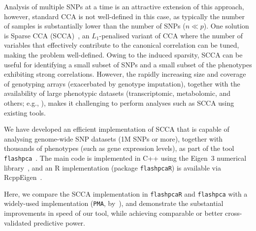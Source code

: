 \documentclass{bioinfo}
\begin{document}
Analysis of multiple SNPs at a time is an attractive extension of
this approach, however, standard CCA is not well-defined in this
case, as typically the number of samples is substantially lower
than the number of SNPs ($n{\ll}p$).  One solution is Sparse CCA
(SCCA)~\citep{Witten2009b,Witten2009c,Parkhomenko2009}, an $L_1$-penalised
variant of CCA where the number of variables that effectively contribute to
the canonical correlation can be tuned, making the problem well-defined. Owing
to the induced sparsity, SCCA can be useful for identifying a small subset of
SNPs and a small subset of the phenotypes exhibiting strong correlations.
However, the rapidly increasing size and coverage of genotyping arrays
(exacerbated by genotype imputation), together with the availability of
large phenotypic datasets (transcriptomic, metabolomic, and others; e.g.,
\citet{Bartel2015,TheGTExConsortium2015}), makes it challenging to perform
analyses such as SCCA using existing tools.

We have developed an efficient implementation of SCCA that is capable of
analysing genome-wide SNP datasets (1M SNPs or more), together with thousands of
phenotypes (such as gene expression levels), as part of the tool
\texttt{flashpca}~\citep{Abraham2014}. The main code is implemented in
\textsf{C++} using the Eigen~3 numerical library~\citep{eigenweb}, and an
\textsf{R} implementation (package \texttt{flashpcaR}) is available via
RcppEigen~\citep{Bates2013}.

Here, we compare the SCCA implementation in \texttt{flashpcaR} and
\texttt{flashpca} with a widely-used implementation (\texttt{PMA},
by~\citet{Witten2013}), and demonstrate the substantial improvements in speed of
our tool, while achieving comparable or better cross-validated predictive power.
\end{document}

